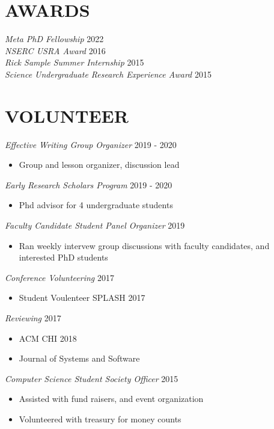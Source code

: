 \documentclass[line,margin]{res}
\begin{document}
\begin{resume}
{\section{AWARDS}
{\sl Meta PhD Fellowship} \hfill 2022 \\
{\sl NSERC USRA Award} \hfill 2016\\
{\sl Rick Sample Summer Internship} \hfill 2015\\
{\sl Science Undergraduate Research Experience Award} \hfill 2015\\


\section{VOLUNTEER}

{\sl Effective Writing Group Organizer} {\hfill 2019 - 2020}
    \begin{itemize}
        \item Group and lesson organizer, discussion lead
    \end{itemize}

{\sl Early Research Scholars Program} {\hfill 2019 - 2020}
    \begin{itemize}
        \item Phd advisor for 4 undergraduate students
    \end{itemize}

{\sl Faculty Candidate Student Panel Organizer} {\hfill 2019}
    \begin{itemize}
        \item Ran weekly intervew group discussions with faculty
            candidates, and interested PhD students
     \end{itemize}

{\sl Conference Volunteering} \hfill 2017
    \begin{itemize}
        \item Student Voulenteer SPLASH 2017
    \end{itemize}

{\sl Reviewing} \hfill 2017
    \begin{itemize}
        \item ACM CHI 2018
        \item Journal of Systems and Software
    \end{itemize}

{\sl Computer Science Student Society Officer} \hfill 2015
    \begin{itemize}
        \item Assisted with fund raisers, and event organization
        \item Volunteered with treasury for money counts
    \end{itemize}

}
\end{resume}
\end{document}
